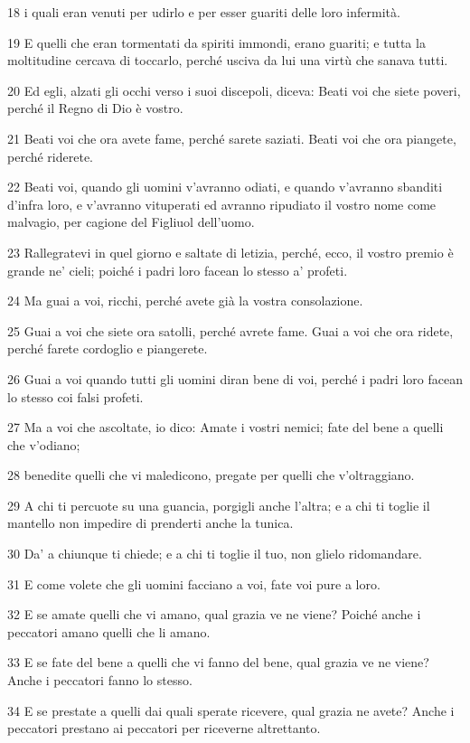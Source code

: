 \par 18 i quali eran venuti per udirlo e per esser guariti delle loro infermità.
\par 19 E quelli che eran tormentati da spiriti immondi, erano guariti; e tutta la moltitudine cercava di toccarlo, perché usciva da lui una virtù che sanava tutti.
\par 20 Ed egli, alzati gli occhi verso i suoi discepoli, diceva: Beati voi che siete poveri, perché il Regno di Dio è vostro.
\par 21 Beati voi che ora avete fame, perché sarete saziati. Beati voi che ora piangete, perché riderete.
\par 22 Beati voi, quando gli uomini v'avranno odiati, e quando v'avranno sbanditi d'infra loro, e v'avranno vituperati ed avranno ripudiato il vostro nome come malvagio, per cagione del Figliuol dell'uomo.
\par 23 Rallegratevi in quel giorno e saltate di letizia, perché, ecco, il vostro premio è grande ne' cieli; poiché i padri loro facean lo stesso a' profeti.
\par 24 Ma guai a voi, ricchi, perché avete già la vostra consolazione.
\par 25 Guai a voi che siete ora satolli, perché avrete fame. Guai a voi che ora ridete, perché farete cordoglio e piangerete.
\par 26 Guai a voi quando tutti gli uomini diran bene di voi, perché i padri loro facean lo stesso coi falsi profeti.
\par 27 Ma a voi che ascoltate, io dico: Amate i vostri nemici; fate del bene a quelli che v'odiano;
\par 28 benedite quelli che vi maledicono, pregate per quelli che v'oltraggiano.
\par 29 A chi ti percuote su una guancia, porgigli anche l'altra; e a chi ti toglie il mantello non impedire di prenderti anche la tunica.
\par 30 Da' a chiunque ti chiede; e a chi ti toglie il tuo, non glielo ridomandare.
\par 31 E come volete che gli uomini facciano a voi, fate voi pure a loro.
\par 32 E se amate quelli che vi amano, qual grazia ve ne viene? Poiché anche i peccatori amano quelli che li amano.
\par 33 E se fate del bene a quelli che vi fanno del bene, qual grazia ve ne viene? Anche i peccatori fanno lo stesso.
\par 34 E se prestate a quelli dai quali sperate ricevere, qual grazia ne avete? Anche i peccatori prestano ai peccatori per riceverne altrettanto.
